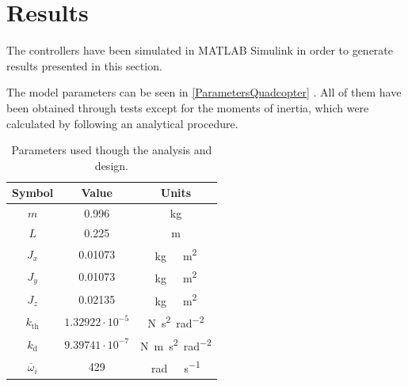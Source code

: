 \section{Results}\label{sec:results}
The controllers have been simulated in MATLAB Simulink in order to generate results presented in this section.  

The model parameters can be seen in \autoref{ParametersQuadcopter} . All of them have been obtained through tests except for the moments of inertia, which were calculated by following an analytical procedure. 

\begin{table}[H]
    \centering
    \begin{tabular}{c|c|c}
        \textbf{Symbol} &\textbf{Value} &\textbf{Units}\\
        \hline %
        $m$ & 0.996       &kg\\
        \hline %
        $L$  &   0.225       & m\\
        \hline %
        $J_x$  & 0.01073       & \si{kg \  m^2}\\
        \hline %
        $J_y$  & 0.01073       & \si{kg \  m^2}\\
        \hline %
        $J_z$  & 0.02135       & \si{kg \  m^2}\\
        \hline %
        $k_{\mathrm{th}}$  & $1.32922\cdot10^{-5}$       & \si{N s^2 rad^{-2}}\\
        \hline %
        $k_{\mathrm{d}}$  & $9.39741 \cdot10^{-7}$       & \si{N m s^2  rad^{-2}}\\
        \hline %
        $\overline{\omega}_i$& 429      & \si{rad \ s^{-1}}\\
        
    \end{tabular}
    \caption{Parameters used though the analysis and design.}
    \label{ParametersQuadcopter}
\end{table}
